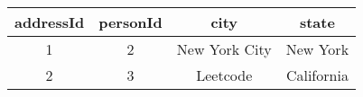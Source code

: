 \begin{tabular}{|c|c|c|c|}
    \hline
        \textbf{addressId} & \textbf{personId} & \textbf{city} & \textbf{state} \\ \hline
        1 & 2 & New York City & New York \\ 
        2 & 3 & Leetcode & California \\ \hline
\end{tabular}
